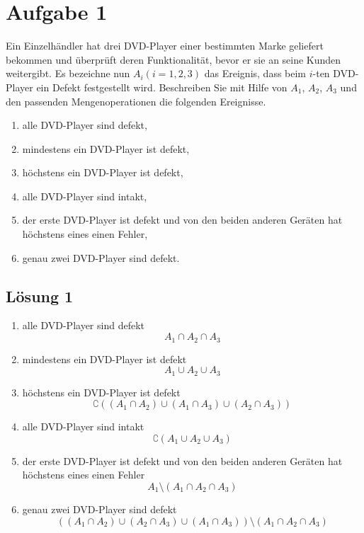 \documentclass[main.tex]{subfiles}
\begin{document}
\section{Aufgabe 1}
Ein Einzelhändler hat drei DVD-Player einer bestimmten Marke geliefert bekommen und überprüft deren Funktionalität, bevor er sie an seine Kunden weitergibt. Es bezeichne nun $A_i (i = 1, 2, 3)$ das Ereignis, dass beim $i$-ten DVD-Player ein Defekt festgestellt wird. Beschreiben Sie mit Hilfe von $A_1$, $A_2$, $A_3$ und den passenden Mengenoperationen die folgenden Ereignisse.
\begin{enumerate}
    \item alle DVD-Player sind defekt,
    \item mindestens ein DVD-Player ist defekt,
    \item höchstens ein DVD-Player ist defekt,
    \item alle DVD-Player sind intakt,
    \item der erste DVD-Player ist defekt und von den beiden anderen Geräten hat höchstens eines einen Fehler,
    \item genau zwei DVD-Player sind defekt.
\end{enumerate}

\subsection{Lösung 1}
\begin{enumerate}
    \item alle DVD-Player sind defekt $$
        A_1 \cap A_2 \cap A_3
    $$
    \item mindestens ein DVD-Player ist defekt $$
        A_1 \cup A_2 \cup A_3
    $$
    \item höchstens ein DVD-Player ist defekt $$
        \complement ((A_1 \cap A_2) \cup (A_1 \cap A_3) \cup (A_2 \cap A_3))
    $$
    \item alle DVD-Player sind intakt $$
        \complement (A_1 \cup A_2 \cup A_3)
    $$
    \item der erste DVD-Player ist defekt und von den beiden anderen Geräten hat höchstens eines einen Fehler $$
        A_1 \setminus (A_1\cap A_2 \cap A_3)
    $$
    \item genau zwei DVD-Player sind defekt $$
        \left(
        (A_1 \cap A_2) \cup (A_2 \cap A_3) \cup (A_1 \cap A_3)
        \right) \setminus (A_1 \cap A_2 \cap A_3)
    $$
\end{enumerate}
\end{document}
